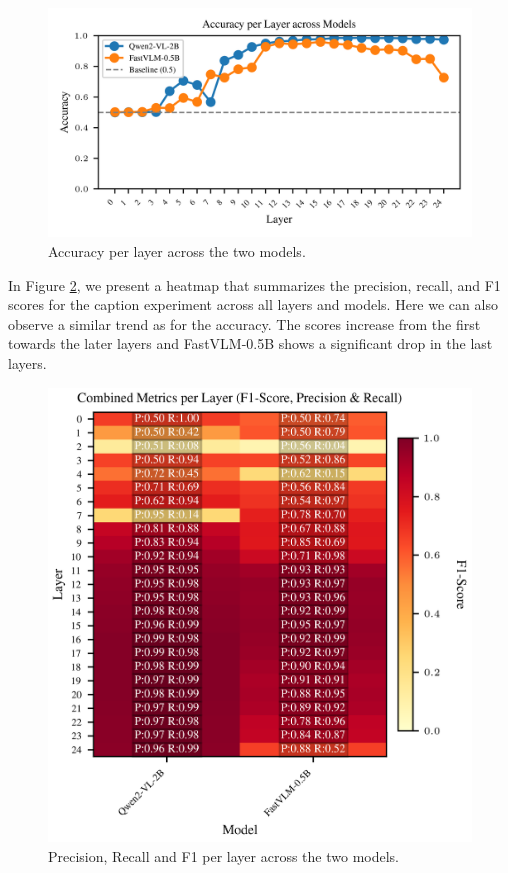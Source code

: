 \documentclass[11pt]{article}
\begin{document}
\begin{figure}[H]
    \centering
    \includegraphics[width=1\linewidth]{figures/global/_combined_exp1/accuracy_lines_per_layer.png}
    \caption{Accuracy per layer across the two models.}
    \label{fig:accuracy_per_layer}
\end{figure}
\noindent In Figure \ref{fig:combined_metrics_per_layer}, we present a heatmap that summarizes the precision, recall, and F1 scores for the caption experiment across all layers and models.
Here we can also observe a similar trend as for the accuracy. The scores increase from the first towards the later layers and FastVLM-0.5B shows a significant drop in the last layers.
\begin{figure}[H]
    \centering
    \includegraphics[width=1\linewidth]{figures/global/_combined_exp1/combined_metrics_heatmap.png}
    \caption{Precision, Recall and F1 per layer across the two models.}
    \label{fig:combined_metrics_per_layer}
\end{figure}
\end{document}
